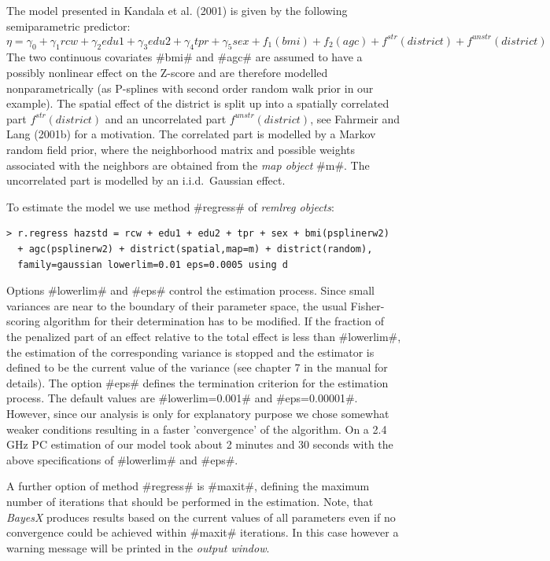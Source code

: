 The model presented in Kandala et al. (2001) is given by the
following semiparametric predictor:
\[\eta=\gamma_0+\gamma_1rcw+\gamma_2edu1+\gamma_3edu2+\gamma_4tpr+\gamma_5sex+f_1(bmi)+f_2(agc)+f^{str}(district)+f^{unstr}(district)\]
The two continuous covariates #bmi# and #agc# are assumed
to have a possibly nonlinear effect on the Z-score and are
therefore modelled nonparametrically (as P-splines with second
order random walk prior in our example). The spatial effect of the
district is split up into a spatially correlated part $
f^{str}(district)$ and an uncorrelated part $f^{unstr}(district)$,
see Fahrmeir and Lang (2001b) for a motivation. The correlated
part is modelled by a Markov random field prior, where the
neighborhood matrix and possible weights associated with the
neighbors are obtained from the {\it map object} #m#. The
uncorrelated part is modelled by an  i.i.d.~Gaussian effect.

To estimate the model we use method #regress# of {\em remlreg
objects}:
\begin{verbatim}
> r.regress hazstd = rcw + edu1 + edu2 + tpr + sex + bmi(psplinerw2)
  + agc(psplinerw2) + district(spatial,map=m) + district(random),
  family=gaussian lowerlim=0.01 eps=0.0005 using d
\end{verbatim}

Options #lowerlim# and #eps# control the estimation process. Since
small variances are near to the boundary of their parameter space,
the usual Fisher-scoring algorithm for their determination has to
be modified. If the fraction of the penalized part of an effect
relative to the total effect is less than #lowerlim#, the
estimation of the corresponding variance is stopped and the
estimator is defined to be the current value of the variance (see
chapter 7 in the manual for details). The option #eps# defines the
termination criterion for the estimation process. The default
values are #lowerlim=0.001# and #eps=0.00001#. However, since our
analysis is only for explanatory purpose we chose somewhat weaker
conditions resulting in a faster 'convergence' of the algorithm.
On a 2.4 GHz PC estimation of our model took about 2 minutes and
30 seconds with the above specifications of #lowerlim# and #eps#.

A further option of method #regress# is #maxit#, defining the
maximum number of iterations that should be performed in the
estimation. Note, that {\it BayesX} produces results based on the
current values of all parameters even if no convergence could be
achieved within #maxit# iterations. In this case however a warning
message will be printed in the {\it output window}.

